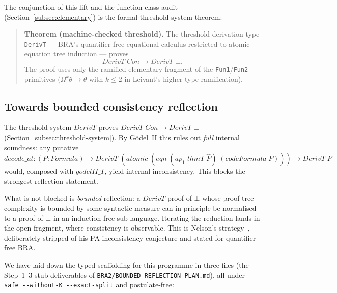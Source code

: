 \documentclass[11pt]{article}
\begin{document}
The conjunction of this lift and the function-class audit
(Section~\ref{subsec:elementary}) is the formal threshold-system
theorem:
\begin{quote}
\textbf{Theorem (machine-checked threshold).}  The threshold
derivation type \verb|DerivT| --- BRA's quantifier-free equational
calculus restricted to atomic-equation tree induction --- proves
\[
  \mathit{DerivT}\;\mathit{Con} \to \mathit{DerivT}\;\bot.
\]
The proof uses only the ramified-elementary fragment of the
\verb|Fun1|/\verb|Fun2| primitives ($\Omega^k\theta \to \theta$
with $k \le 2$ in Leivant's higher-type ramification).
\end{quote}

\subsection{Towards bounded consistency reflection}
\label{subsec:bounded-reflection}

The threshold system $\mathit{DerivT}$ proves
$\mathit{DerivT}\;\mathit{Con} \to \mathit{DerivT}\;\bot$
(Section~\ref{subsec:threshold-system}).  By G\"odel~II this rules out
\emph{full} internal soundness: any putative
$\mathit{decode\_at}: (P : \mathit{Formula}) \to
 \mathit{DerivT}\;(\mathit{atomic}\;(\mathit{eqn}\;(\mathit{ap}_1\;
 \mathit{thmT}\;\hat P)\;(\mathit{codeFormula}\;P))) \to \mathit{DerivT}\;P$
would, composed with $\mathit{godelII\_T}$, yield internal
inconsistency.  This blocks the strongest reflection statement.

What is not blocked is \emph{bounded} reflection: a $\mathit{DerivT}$
proof of $\bot$ whose proof-tree complexity is bounded by some
syntactic measure can in principle be normalised to a proof of $\bot$
in an induction-free sub-language.  Iterating the reduction lands in
the open fragment, where consistency is observable.  This is Nelson's
strategy~\cite{nelson1986,nelson2011}, deliberately stripped of his
PA-inconsistency conjecture and stated for quantifier-free BRA.

We have laid down the typed scaffolding for this programme in three
files (the Step~1--3-stub deliverables of
\verb|BRA2/BOUNDED-REFLECTION-PLAN.md|), all under
\verb|--safe --without-K --exact-split| and postulate-free:
\end{document}
